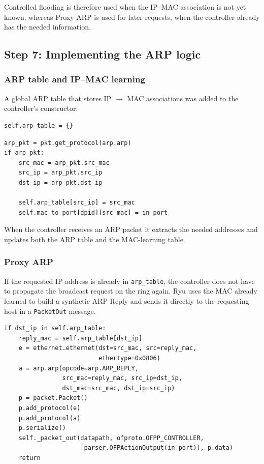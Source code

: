 \documentclass[11pt,a4paper]{article}
\newcommand{\code}[1]{\texttt{#1}}
\begin{document}
Controlled flooding is therefore used when the IP--MAC association is not yet
known, whereas Proxy ARP is used for later requests, when the controller already
has the needed information.

\subsection{Step 7: Implementing the ARP logic}
\subsubsection{ARP table and IP--MAC learning}
A global ARP table that stores IP $\to$ MAC associations was added to the
controller's constructor:

\begin{lstlisting}[style=py,caption={Global ARP table of the controller}]
self.arp_table = {}
\end{lstlisting}

\begin{lstlisting}[style=py,caption={Learning ARP information}]
arp_pkt = pkt.get_protocol(arp.arp)
if arp_pkt:
    src_mac = arp_pkt.src_mac
    src_ip = arp_pkt.src_ip
    dst_ip = arp_pkt.dst_ip

    self.arp_table[src_ip] = src_mac
    self.mac_to_port[dpid][src_mac] = in_port
\end{lstlisting}

When the controller receives an ARP packet it extracts the needed addresses and
updates both the ARP table and the MAC-learning table.

\subsubsection{Proxy ARP}
If the requested IP address is already in \code{arp\_table}, the controller does
not have to propagate the broadcast request on the ring again. Ryu uses the MAC
already learned to build a synthetic ARP Reply and sends it directly to the
requesting host in a \code{PacketOut} message.

\begin{lstlisting}[style=py,caption={Proxy ARP when the MAC is known}]
if dst_ip in self.arp_table:
    reply_mac = self.arp_table[dst_ip]
    e = ethernet.ethernet(dst=src_mac, src=reply_mac,
                          ethertype=0x0806)
    a = arp.arp(opcode=arp.ARP_REPLY,
                src_mac=reply_mac, src_ip=dst_ip,
                dst_mac=src_mac, dst_ip=src_ip)
    p = packet.Packet()
    p.add_protocol(e)
    p.add_protocol(a)
    p.serialize()
    self._packet_out(datapath, ofproto.OFPP_CONTROLLER,
                     [parser.OFPActionOutput(in_port)], p.data)
    return
\end{lstlisting}
\end{document}
